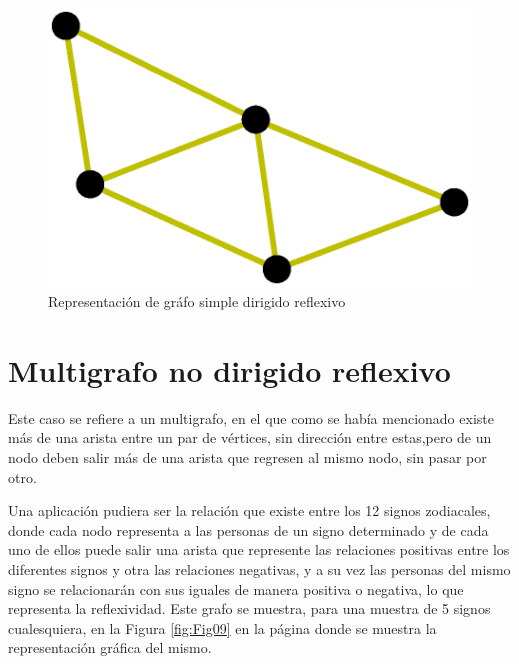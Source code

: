 \documentclass{article}
\begin{document}


\begin{figure}
    \centering
    \includegraphics[scale=0.6]{imagenes/Fig08.eps}
    \caption{Representación de gráfo simple dirigido reflexivo}
    \label{fig:Fig08}
\end{figure}

\section{Multigrafo no dirigido reflexivo}

Este caso se refiere a un multigrafo, en el que como se había mencionado existe más de una arista entre un par de vértices, sin dirección entre estas,pero de un nodo deben salir más de una arista que regresen al mismo nodo, sin pasar por otro.

Una aplicación pudiera ser la relación que existe entre los 12 signos zodiacales, donde cada nodo representa a las personas de un signo determinado y de cada uno de ellos puede salir una arista que represente las relaciones positivas entre los diferentes signos y otra las relaciones negativas, y a su vez las personas del mismo signo se relacionarán con sus iguales de manera positiva o negativa, lo que representa la reflexividad. Este grafo se muestra, para una muestra de 5 signos cualesquiera, en la Figura \ref{fig:Fig09} en la página \pageref{fig:Fig09} donde se muestra la representación gráfica del mismo. 


\end{document}
